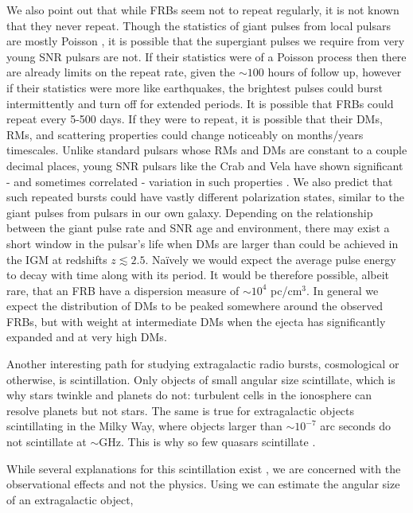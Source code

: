 \documentclass[useAMS,usenatbib]{mn2e}
\begin{document}
We also point out that while FRBs seem not to repeat regularly, 
it is not known that they never repeat. Though the statistics 
of giant pulses from local pulsars are mostly Poisson \citep{1999ApJ...517..460S},
it is possible that 
the supergiant pulses we require from very young SNR pulsars are not. If their 
statistics were of a Poisson process then there are already limits on the repeat rate, 
given the $\sim100$ hours of follow up, however if their statistics were more like
earthquakes, the brightest pulses could burst intermittently and turn off
for extended periods. It is possible that FRBs could repeat every 5-500 days. 
If they were to repeat,
it is possible that their DMs, RMs, and scattering properties could 
change noticeably on months/years timescales. Unlike standard pulsars 
whose RMs and DMs are constant to a couple decimal places, young 
SNR pulsars like the Crab and Vela have shown significant - and sometimes
correlated - variation in such properties \citep{1988A&A...202..166R, 2008A&A...483...13K}.
We also predict that such repeated 
bursts could have vastly different polarization states, similar to the giant 
pulses from pulsars in our own galaxy. 
Depending on the relationship between the giant pulse rate and SNR
age and environment, there may exist a short window in the pulsar's life when 
DMs are larger than could be achieved in the IGM at redshifts $z\lesssim2.5$. 
Na\"ively we would expect the average pulse 
energy to decay with time along with its period. 
It would be therefore possible, albeit rare, that an FRB have a dispersion 
measure of $\sim10^4$ pc/cm$^3$. In general we expect the distribution of DMs 
to be peaked somewhere around the observed FRBs, but with weight at intermediate 
DMs when the ejecta has significantly expanded and at very high DMs.  
 
Another interesting path for studying extragalactic radio bursts, 
cosmological or otherwise, is scintillation. Only objects of small angular
size scintillate, which is why stars twinkle and planets do not: turbulent cells
in the ionosphere can resolve planets but not stars. The same is true for extragalactic
objects scintillating in the Milky Way, where objects larger than $\sim10^{-7}$ 
arc seconds do not scintillate at $\sim$GHz. 
This is why so few quasars scintillate \citep{2002Natur.415...57D}. 

While several explanations for this scintillation exist 
\citep{1992RSPTA.341..151N, 2014MNRAS.442.3338P}, we are  
concerned with the observational effects and not the physics. 
Using \cite{1986isra.book.....T} 
we can estimate the angular size of an extragalactic object,
\end{document}

